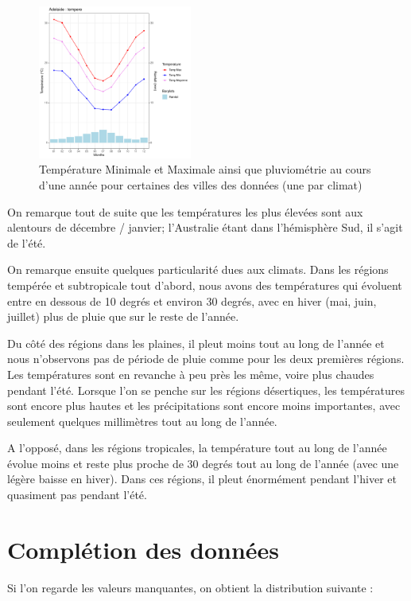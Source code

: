 \documentclass{article}
\begin{document}
\begin{figure}[H]
    \includegraphics[page=32,width=0.45\textwidth]{Ressources/Temp_and_Rainfall.pdf}
    \caption{Température Minimale et Maximale ainsi que pluviométrie au cours d'une année pour certaines des villes des données (une par climat)}
\end{figure}

On remarque tout de suite que les températures les plus élevées sont aux alentours de décembre / janvier; l'Australie étant dans l'hémisphère Sud, il s'agit de l'été. 

On remarque ensuite quelques particularité dues aux climats. Dans les régions tempérée et subtropicale tout d'abord, nous avons des températures qui évoluent entre en dessous de 10 degrés et environ 30 degrés, avec en hiver (mai, juin, juillet) plus de pluie que sur le reste de l'année.

Du côté des régions dans les plaines, il pleut moins tout au long de l'année et nous n'observons pas de période de pluie comme pour les deux premières régions. Les températures sont en revanche à peu près les même, voire plus chaudes pendant l'été. Lorsque l'on se penche sur les régions désertiques, les températures sont encore plus hautes et les précipitations sont encore moins importantes, avec seulement quelques millimètres tout au long de l'année. 

A l'opposé, dans les régions tropicales, la température tout au long de l'année évolue moins et reste plus proche de 30 degrés tout au long de l'année (avec une légère baisse en hiver). Dans ces régions, il pleut énormément pendant l'hiver et quasiment pas pendant l'été.

\section{Complétion des données}

Si l'on regarde les valeurs manquantes, on obtient la distribution suivante : 
\end{document}
